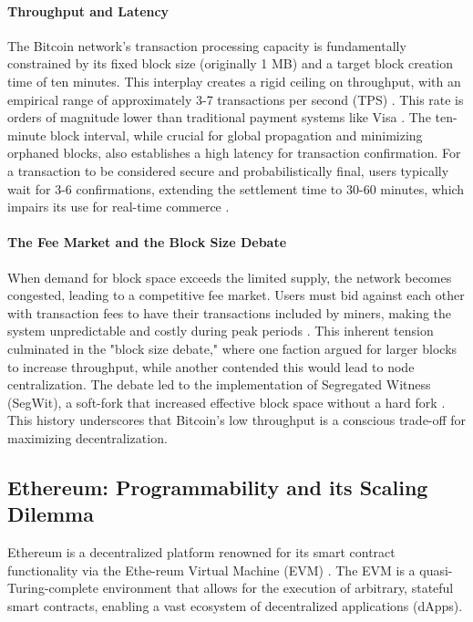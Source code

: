\documentclass{DESSThesis}
\begin{document}
\paragraph{Throughput and Latency} 
The Bitcoin network's transaction processing capacity is fundamentally constrained by its fixed block size (originally 1 MB) and a target block creation time of ten minutes. This interplay creates a rigid ceiling on throughput, with an empirical range of approximately 3-7 transactions per second (TPS) \cite{croman_scaling_2016}. This rate is orders of magnitude lower than traditional payment systems like Visa \cite{maharjan_performance_nodate}. The ten-minute block interval, while crucial for global propagation and minimizing orphaned blocks, also establishes a high latency for transaction confirmation. For a transaction to be considered secure and probabilistically final, users typically wait for 3-6 confirmations, extending the settlement time to 30-60 minutes, which impairs its use for real-time commerce \cite{gervais_security_2016}.

\paragraph{The Fee Market and the Block Size Debate} 
When demand for block space exceeds the limited supply, the network becomes congested, leading to a competitive fee market. Users must bid against each other with transaction fees to have their transactions included by miners, making the system unpredictable and costly during peak periods \cite{moser_trends_2015}. This inherent tension culminated in the "block size debate," where one faction argued for larger blocks to increase throughput, while another contended this would lead to node centralization. The debate led to the implementation of Segregated Witness (SegWit), a soft-fork that increased effective block space without a hard fork \cite{poon_bitcoin_nodate}. This history underscores that Bitcoin's low throughput is a conscious trade-off for maximizing decentralization.

\subsection{Ethereum: Programmability and its Scaling Dilemma}
\label{subsec:ethereum_l1}
Ethereum is a decentralized platform renowned for its smart contract functionality via the Ethe-reum Virtual Machine (EVM) \cite{noauthor_ethereum_nodate_evm}. The EVM is a quasi-Turing-complete environment that allows for the execution of arbitrary, stateful smart contracts, enabling a vast ecosystem of decentralized applications (dApps).
\end{document}
